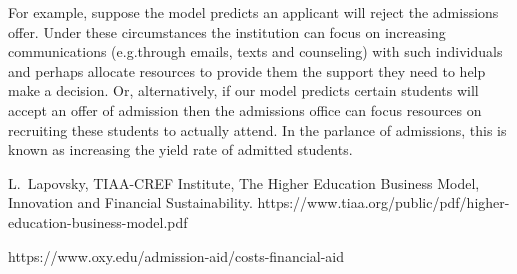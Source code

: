 \documentclass[11pt, oneside]{article}   	%
\begin{document}
For example, suppose the model predicts an applicant will reject the admissions offer. Under these circumstances the institution can focus on increasing communications (e.g.through emails, texts and counseling) with such individuals and perhaps allocate resources to provide them the support they need to help make a decision. Or, alternatively, if our model predicts certain students will accept an offer of admission  then the admissions office  can focus resources on recruiting these students to actually attend. In the parlance of admissions, this is known as increasing the yield rate of admitted students.


\begin{thebibliography}{00}

\begin{comment}
\bibitem{Godsey} Brian Godsey, 
Think Like a Data Scientist {\em Manning}, ISBN: 9781633430273 

\bibitem{BrRiFe} H.~Brink, J.~Richards, M.~Fetherolf, Real World Machine Learning,
 {\em Manning}, ISBN: 9781617291920

\bibitem{CiMeAl} D.~Cielen, A.~Meysman, M.~Ali,
Introducing Data Science, {\em
Manning} ISBN: 9781633430037.

\bibitem{Gr} J.~Grus, Data Science From Scratch First Principles With Python, {\em O'Reilly} 
ISBN: 9781491901427

\bibitem{Ge} A.~G\'{e}ron, Hands-On Machine Learning with Scikit-Learn \& Tensor Flow, {\em O'Reilly} 
ISBN: 9781491962299

\bibitem{HaTiFr} T.~Hastie, R.~Tibshirani, J.~Friedman, The Elements of Statistical Learning, Second Edition, {\em Springer} 

\bibitem{JaWiHaTi} G.~James, D.~Witten, T.~Hastie, R.~Tibshirani, An Introduction to Statistical Learning with Applications in R, {\em Springer}, ISBN 9781461471370
\end{comment}
 L.~Lapovsky, TIAA-CREF Institute, The Higher Education Business Model,
Innovation and Financial Sustainability.
https://www.tiaa.org/public/pdf/higher-education-business-model.pdf

 https://www.oxy.edu/admission-aid/costs-financial-aid

\end{thebibliography}
\end{document}
